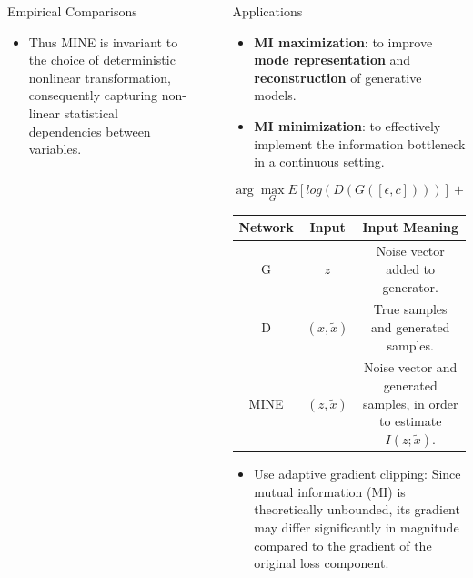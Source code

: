 \documentclass[final]{beamer}
\newlength{\sepwidth}
\newlength{\colwidth}
\newcommand{\separatorcolumn}{\begin{column}{\sepwidth}\end{column}}
\begin{document}
\begin{frame}[t]
\begin{columns}[t]
\begin{column}{\colwidth}
\begin{block}{Empirical Comparisons}
\begin{itemize}
            \item 
            Thus MINE is invariant to the choice of deterministic nonlinear transformation, consequently capturing non-linear statistical dependencies between variables.
        \end{itemize}

\end{block}

\end{column}
\separatorcolumn

\begin{column}{\colwidth}

\begin{block}{Applications}

    \begin{itemize}
      \item \textbf{MI maximization}: to improve \textbf{mode representation} and \textbf{reconstruction} of generative models.
      \item \textbf{MI minimization}: to effectively implement the information bottleneck in a continuous setting.
    \end{itemize}

$$\arg \max_G E[log(D(G([\epsilon, c])))] + βI(G([\epsilon, c]); c)$$
    \begin{table}[]
    \begin{tabular}{c c c}
    \toprule
    \textbf{Network} & \textbf{Input}            & \textbf{Input Meaning}                                    \\
    \midrule
    G               & $z$                       & Noise vector added to generator.                           \\
    D               & $(x ,  \tilde{x})$          & True samples and generated samples.                        \\
    MINE            & $(z ,  \tilde{x})$          & Noise vector and generated samples, in order to estimate $I(z ;\tilde{x})$. \\
    \bottomrule
    \end{tabular}
    \end{table}
\begin{itemize}
    \item Use adaptive gradient clipping: Since mutual information (MI) is theoretically unbounded, its gradient may differ significantly in magnitude compared to the gradient of the original loss component.
    


\end{itemize}
\end{block}
\end{column}
\end{columns}
\end{frame}
\end{document}
